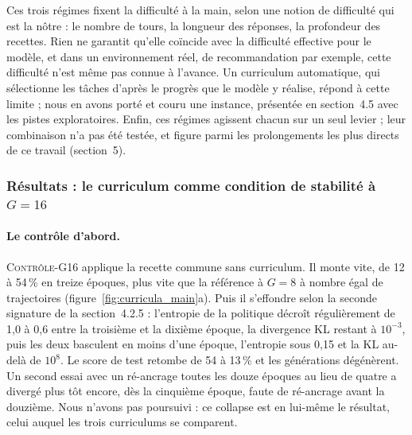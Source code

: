 \documentclass[11pt,a4paper]{article}
\begin{document}
Ces trois régimes fixent la difficulté à la main, selon une notion de difficulté qui est la nôtre : le nombre de tours, la longueur des réponses, la profondeur des recettes. Rien ne garantit qu'elle coïncide avec la difficulté effective pour le modèle, et dans un environnement réel, de recommandation par exemple, cette difficulté n'est même pas connue à l'avance. Un curriculum automatique, qui sélectionne les tâches d'après le progrès que le modèle y réalise, répond à cette limite ; nous en avons porté et couru une instance, présentée en section~4.5 avec les pistes exploratoires. Enfin, ces régimes agissent chacun sur un seul levier ; leur combinaison n'a pas été testée, et figure parmi les prolongements les plus directs de ce travail (section~5).






\subsubsection{Résultats : le curriculum comme condition de stabilité à $G=16$}

\paragraph{Le contrôle d'abord.} \textsc{Contrôle-G16} applique la recette commune sans curriculum. Il monte vite, de 12 à 54\,\% en treize époques, plus vite que la référence à $G=8$ à nombre égal de trajectoires (figure~\ref{fig:curricula_main}a). Puis il s'effondre selon la seconde signature de la section~4.2.5 : l'entropie de la politique décroît régulièrement de 1{,}0 à 0{,}6 entre la troisième et la dixième époque, la divergence KL restant à $10^{-3}$, puis les deux basculent en moins d'une époque, l'entropie sous 0{,}15 et la KL au-delà de $10^{8}$. Le score de test retombe de 54 à 13\,\% et les générations dégénèrent. Un second essai avec un ré-ancrage toutes les douze époques au lieu de quatre a divergé plus tôt encore, dès la cinquième époque, faute de ré-ancrage avant la douzième. Nous n'avons pas poursuivi : ce collapse est en lui-même le résultat, celui auquel les trois curriculums se comparent.
\end{document}
